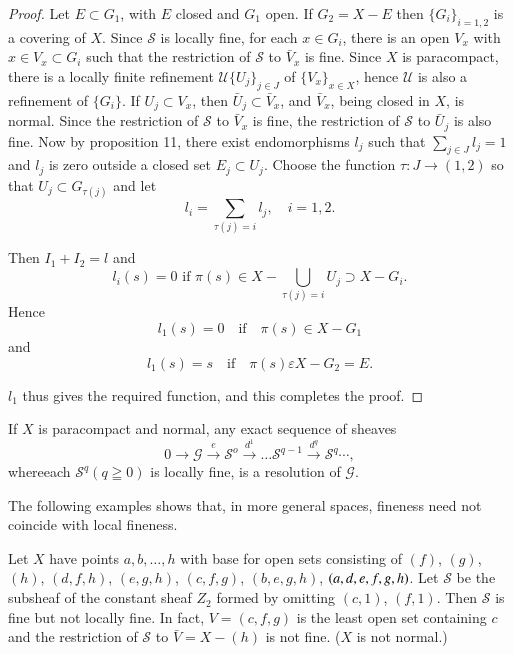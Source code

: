 \begin{proof}
Let $E \subset G_1$, with $E$ closed and $G_1$ open. If $G_2 = X-E$
then $\{ G_i\}_{i=1,2}$ is a covering of $X$. Since $\mathscr{S}$ is
locally fine, for each $x \in G_i$, there is an open $V_x$
with $x \in V_x \subset G_i$ such that the restriction of
$\mathscr{S}$ to $\bar{V}_x$ is fine. Since $X$ is paracompact, there
is a locally finite refinement $ \mathscr{U}\{U_j\}_{j \in J}$
of $\{V_x\}_{x \in X}$, hence $\mathscr{U}$ is also a
refinement of $\{G_i\}$. If $U_j \subset V_x$, then $\bar{U}_j \subset
\bar{V}_x$, and $\bar{V}_x$, being closed in $X$, is normal. Since the
restriction of $\mathscr{S}$ to $\bar{V}_x$ is fine, the restriction
of $\mathscr{S}$ to $\bar{U}_j$ is also fine. Now by proposition 11,
there exist endomorphisms $l_j$ such that $\sum\limits_{j \in
  J} l_j =1$ and $l_j$ is zero outside a closed set $E_j \subset
U_j$. Choose the function $\tau : J \to (1,2)$ so that $U_j \subset
G_{\tau (j)}$ and let   
$$
l_i = \sum_{ \tau (j) = i} l_j, \quad i= 1, 2. 
$$

Then $I_1 + I_2 = l$ and
$$
l_i (s)  = 0 \text{ if } \pi (s) \in X - \bigcup _{\tau (j) =
  i} U_j \supset X -G_i. 
$$
Hence
$$
l_1 (s)  = 0  \quad \text{if} \quad  \pi (s) \in X - G_1
$$  
and 
$$
l_1 (s)  = s \quad \text{if} \quad \pi (s) \varepsilon X -G_2 = E.
$$

$l_1$ thus gives the required function, and this completes the proof. 
\end{proof}

\begin{coro*}
If $X$ is paracompact and normal, any exact sequence of sheaves  
$$
0 \to \mathscr{G} \xrightarrow {e} \mathscr{S}^o \xrightarrow{d^1}
\dots \mathscr{S}^{q-1} \xrightarrow{d^q} \mathscr{S}^q \cdots, 
$$
where\pageoriginale each $\mathscr{S}^q (q \geqq 0)$ is locally fine,
is a resolution of $\mathscr{G}$.  
\end{coro*}

The following examples shows that, in more general spaces, fineness
need not coincide with local fineness.  

\begin{exam}%
Let $X$ have points $a, b ,\ldots, h$ with base for open sets
consisting of $(f)$, $(g)$, $(h)$, $(d,f,h)$, $(e,g,h)$, $(c,f,g)$,
$(b,e,g,h)$, $(a,d,e,f,\break g,h)$. Let $\mathscr{S}$ be the subsheaf of the
constant sheaf $Z_2$ formed by omitting $(c,1)$, $(f,1)$. Then
$\mathscr{S}$ is fine but not locally fine. In fact, $V = (c,f,g)$ is
the least open set containing $c$ and the restriction of $\mathscr{S}$
to $\bar{V} = X -(h)$ is not fine. ($X$ is not normal.)  
\end{exam}


